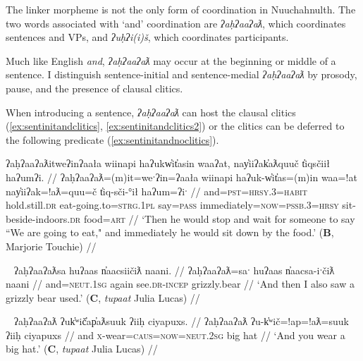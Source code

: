 The linker morpheme is not the only form of coordination in Nuuchahnulth. The two words associated with `and' coordination are \textit{ʔaḥʔaaʔaƛ}, which coordinates sentences and VPs, and \textit{ʔuḥʔi(i)š}, which coordinates participants.  %

Much like English \textit{and}, \textit{ʔaḥʔaaʔaƛ} may occur at the beginning or middle of a sentence. I distinguish sentence-initial and sentence-medial \textit{ʔaḥʔaaʔaƛ} by prosody, pause, and the presence of clausal clitics.

When introducing a sentence, \textit{ʔaḥʔaaʔaƛ} can host the clausal clitics (\ref{ex:sentinitandclitics}, \ref{ex:sentinitandclitics2}) or the clitics can be deferred to the following predicate (\ref{ex:sentinitandnoclitics}).

\begin{comment}
Context for (): Describing a picture-story.

ʔaanamtqač̓a ʔuusuqtack̓in.
And then he got hurt a little bit.

ʔaḥʔaaʔaƛƛa ƛakišiʔeƛƛa.
And then he stands back up.
BM
\end{comment}

\ex \label{ex:sentinitandclitics}
\begingl
\glpreamble ʔaḥʔaaʔaƛitweʔinʔaała wiinapi haʔukw̓it̓asin waaʔat, nay̓iiʔak̓aƛquuč t̓iqsčiił haʔumʔi. //
\gla ʔaḥʔaaʔaƛ=(m)it=weˑʔin=ʔaała wiinapi haʔuk-w̓it̓as=(m)in waa=!at nay̓iiʔak=!aƛ=quu=č t̓iq-sči-°ił haʔum=ʔiˑ //
\glb and=\textsc{pst}=\textsc{hrsy.3}=\textsc{habit} hold.still.\textsc{dr} eat-going.to=\textsc{strg.1pl} say=\textsc{pass} immediately=\textsc{now}=\textsc{pssb.3}=\textsc{hrsy} sit-beside-indoors.\textsc{dr} food=\textsc{art} //
\glft `Then he would stop and wait for someone to say ``We are going to eat," and immediately he would sit down by the food.' (\textbf{B}, Marjorie Touchie) //
\endgl
\xe


\ex~ \label{ex:sentinitandclitics2}
\begingl
\glpreamble ʔaḥʔaaʔaƛsa huʔaas n̓aacsiičiƛ naani. //
\gla ʔaḥʔaaʔaƛ=saˑ huʔaas n̓aacsa-iˑčiƛ naani //
\glb and=\textsc{neut.1sg} again see.\textsc{dr}-\textsc{incep} grizzly.bear  //
\glft `And then I also saw a grizzly bear used.' (\textbf{C}, \textit{tupaat} Julia Lucas) //
\endgl
\xe

\ex~ \label{ex:sentinitandnoclitics}
\begingl
\glpreamble ʔaḥʔaaʔaƛ ʔuk̓ʷič̓ap̓aƛsuuk ʔiiḥ ciyapuxs. //
\gla ʔaḥʔaaʔaƛ ʔu-k̓ʷič=!ap=!aƛ=suuk ʔiiḥ ciyapuxs //
\glb and \textsc{x}-wear=\textsc{caus}=\textsc{now}=\textsc{neut.2sg} big hat //
\glft `And you wear a big hat.' (\textbf{C}, \textit{tupaat} Julia Lucas) //
\endgl
\xe

